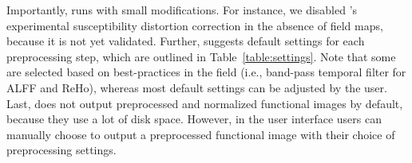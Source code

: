 Importantly,  runs  with small modifications. For instance, we disabled ’s experimental susceptibility distortion correction in the absence of field maps, because it is not yet validated. Further,  suggests default settings for each preprocessing step, which are outlined in Table~\ref{table:settings}. Note that some are selected based on best-practices in the field (i.e., band-pass temporal filter for ALFF and ReHo), whereas most default settings can be adjusted by the user. Last,  does not output preprocessed and normalized functional images by default, because they use a lot of disk space. However, in the user interface users can manually choose to output a preprocessed functional image with their choice of preprocessing settings.
